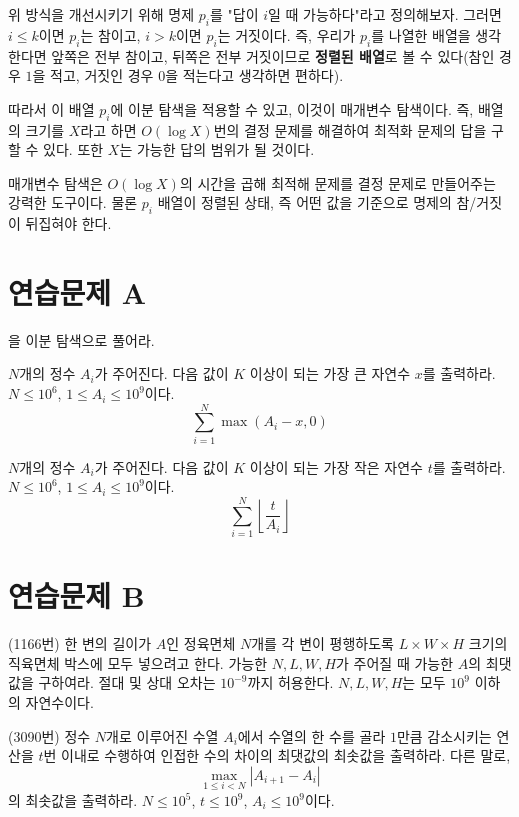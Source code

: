 위 방식을 개선시키기 위해 명제 $p_i$를 "답이 $i$일 때 가능하다"라고 정의해보자. 그러면 $i \leq k$이면 $p_i$는 참이고, $i > k$이면 $p_i$는 거짓이다. 즉, 우리가 $p_i$를 나열한 배열을 생각한다면 앞쪽은 전부 참이고, 뒤쪽은 전부 거짓이므로 \textbf{정렬된 배열}로 볼 수 있다(참인 경우 $1$을 적고, 거짓인 경우 $0$을 적는다고 생각하면 편하다).

따라서 이 배열 $p_i$에 이분 탐색을 적용할 수 있고, 이것이 매개변수 탐색이다. 즉, 배열의 크기를 $X$라고 하면 $O(\log X)$번의 결정 문제를 해결하여 최적화 문제의 답을 구할 수 있다. 또한 $X$는 가능한 답의 범위가 될 것이다.

매개변수 탐색은 $O(\log X)$의 시간을 곱해 최적해 문제를 결정 문제로 만들어주는 강력한 도구이다. 물론 $p_i$ 배열이 정렬된 상태, 즉 어떤 값을 기준으로 명제의 참/거짓이 뒤집혀야 한다.

\section{연습문제 A}
\begin{problem}
    을 이분 탐색으로 풀어라.
\end{problem}

\begin{problem}
    $N$개의 정수 $A_i$가 주어진다. 다음 값이 $K$ 이상이 되는 가장 큰 자연수 $x$를 출력하라. $N \leq 10^6$, $1 \leq A_i \leq 10^9$이다.
    $$\sum_{i=1}^N {\max(A_i - x, 0)}$$
\end{problem}

\begin{problem}
    $N$개의 정수 $A_i$가 주어진다. 다음 값이 $K$ 이상이 되는 가장 작은 자연수 $t$를 출력하라. $N \leq 10^6$, $1 \leq A_i \leq 10^9$이다.
    $$\sum_{i=1}^N {\left\lfloor{\frac{t}{A_i}}\right\rfloor}$$
\end{problem}

\section{연습문제 B}

\begin{problem}
    (1166번) 한 변의 길이가 $A$인 정육면체 $N$개를 각 변이 평행하도록 $L \times W \times H$ 크기의 직육면체 박스에 모두 넣으려고 한다. 가능한 $N, L, W, H$가 주어질 때 가능한 $A$의 최댓값을 구하여라. 절대 및 상대 오차는 $10^{-9}$까지 허용한다. $N, L, W, H$는 모두 $10^9$ 이하의 자연수이다.
\end{problem}

\begin{problem}
    (3090번) 정수 $N$개로 이루어진 수열 $A_i$에서 수열의 한 수를 골라 $1$만큼 감소시키는 연산을 $t$번 이내로 수행하여 인접한 수의 차이의 최댓값의 최솟값을 출력하라. 다른 말로,
    $$\max_{1 \leq i < N} {\left\vert{A_{i+1}-A_i}\right\vert}$$
    의 최솟값을 출력하라. $N \leq 10^5$, $t \leq 10^9$, $A_i \leq 10^9$이다.
\end{problem}

